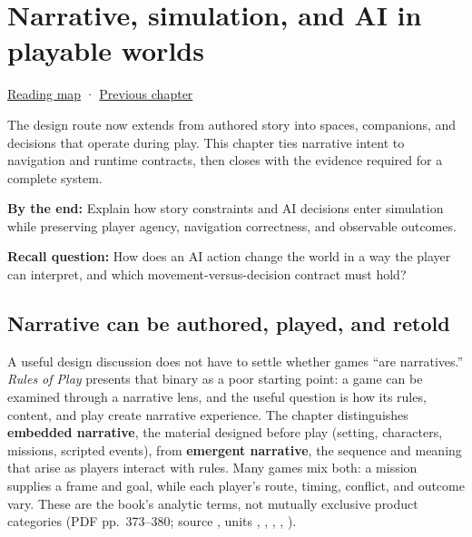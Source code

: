 \chapter{Narrative, simulation, and AI in playable worlds}\label{06-engine-ii-ch047-narrative-simulation-and-ai-in-playable-worlds}\hypertarget{06-engine-ii-ch047}{}\label{stagechapter:06-engine-ii-ch047}

\hypertarget{06-engine-ii-ch047-narrative-simulation-and-ai-in-playable-worlds}{}

\hyperref[volume-reading-map]{Reading map} · \hyperref[06-engine-ii-ch046-game-design-from-mechanics-to-narrative-interfaces]{Previous chapter}

The design route now extends from authored story into spaces, companions, and decisions that operate during play. This chapter ties narrative intent to navigation and runtime contracts, then closes with the evidence required for a complete system.

\textbf{By the end:} Explain how story constraints and AI decisions enter simulation while preserving player agency, navigation correctness, and observable outcomes.

\textbf{Recall question:} How does an AI action change the world in a way the player can interpret, and which movement-versus-decision contract must hold?

\section{Narrative can be authored, played, and retold}\label{06-engine-ii-ch047-narrative-can-be-authored-played-and-retold}

\hypertarget{06-engine-ii-ch047-narrative-can-be-authored-played-and-retold}{}

A useful design discussion does not have to settle whether games ``are narratives.'' \emph{Rules of Play} presents that binary as a poor starting point: a game can be examined through a narrative lens, and the useful question is how its rules, content, and play create narrative experience. The chapter distinguishes \textbf{embedded narrative}, the material designed before play (setting, characters, missions, scripted events), from \textbf{emergent narrative}, the sequence and meaning that arise as players interact with rules. Many games mix both: a mission supplies a frame and goal, while each player's route, timing, conflict, and outcome vary. These are the book's analytic terms, not mutually exclusive product categories (PDF pp.~373--380; source , units , , , , ).


